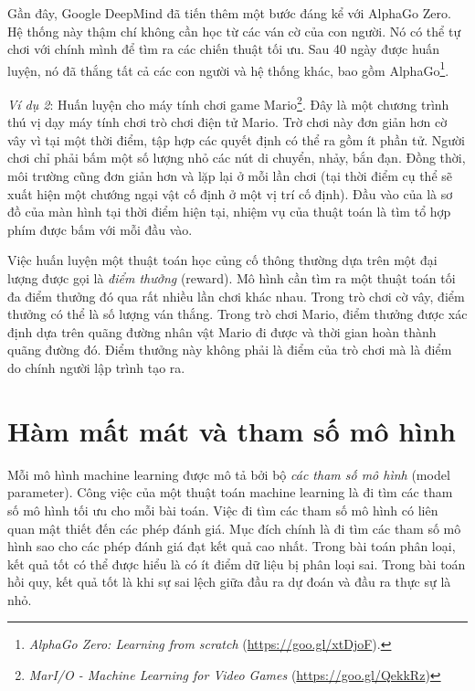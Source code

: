 Gần đây, Google DeepMind đã tiến thêm một bước đáng kể với AlphaGo Zero. Hệ
thống này thậm chí không cần học từ các ván cờ của con người. Nó có thể tự chơi
với chính mình để tìm ra các chiến thuật tối ưu. Sau 40 ngày được huấn luyện, nó
đã thắng tất cả các con người và hệ thống khác, bao gồm
AlphaGo\footnote{\textit{AlphaGo Zero: Learning from scratch}
(\url{https://goo.gl/xtDjoF}).}.

\textit{Ví dụ 2}: {Huấn luyện cho máy tính chơi game
Mario}\footnote{\textit{MarI/O - Machine Learning for Video Games}
(\url{https://goo.gl/QekkRz})}. Đây là một chương trình thú vị dạy máy tính chơi
trò chơi điện tử Mario. Trờ chơi này đơn giản hơn cờ vây vì tại một thời điểm,
tập hợp các quyết định có thể ra gồm ít phần tử. Người chơi chỉ phải bấm một số
lượng nhỏ các nút di chuyển, nhảy, bắn đạn. Đồng thời, môi trường cũng đơn giản
hơn và lặp lại ở mỗi lần chơi (tại thời điểm cụ thể sẽ xuất hiện một chướng ngại
vật cố định ở một vị trí cố định). Đầu vào của là sơ đồ của màn hình tại thời
điểm hiện tại, nhiệm vụ của thuật toán là tìm tổ hợp phím được bấm với mỗi đầu
vào. 

Việc huấn luyện một thuật toán học củng cố thông thường dựa trên một đại lượng
được gọi là \textit{điểm thưởng} (reward). Mô hình cần tìm ra một thuật toán tối đa điểm
thưởng đó qua rất nhiều lần chơi khác nhau. Trong trò chơi cờ vây, điểm thưởng
có thể là số lượng ván thắng. Trong trò chơi Mario, điểm thưởng được xác định
dựa trên quãng đường nhân vật Mario đi được và thời gian hoàn thành quãng đường
đó. Điểm thưởng này không phải là điểm của trò chơi mà là điểm do chính người
lập trình tạo ra.


\section{Hàm mất mát và tham số mô hình}

Mỗi mô hình machine learning được mô tả bởi bộ \textit{các tham số mô hình} (model parameter).
Công việc của một thuật toán machine learning là đi tìm các tham số mô hình tối
ưu cho mỗi bài toán. Việc đi tìm các tham số mô hình có liên quan mật thiết đến
các phép đánh giá. Mục đích chính là đi tìm các tham số mô hình sao cho
các phép đánh giá đạt kết quả cao nhất. Trong bài toán phân loại, kết quả
tốt có thể được hiểu là có ít điểm dữ liệu bị phân loại sai. Trong bài toán
hồi quy, kết quả tốt là khi sự sai lệch giữa đầu ra dự đoán và đầu ra thực sự
là nhỏ.

